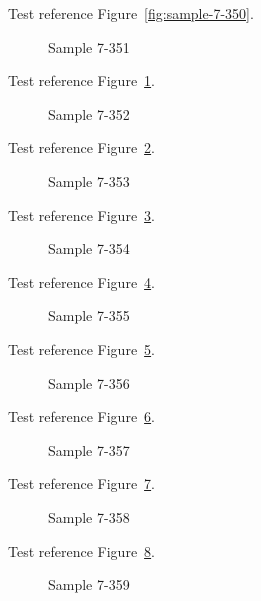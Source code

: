 Test reference Figure~\ref{fig:sample-7-350}.

\begin{figure}[tbhp]
\caption{Sample 7-351}
\label{fig:sample-7-351}
\end{figure}

Test reference Figure~\ref{fig:sample-7-351}.

\begin{figure}[tbhp]
\caption{Sample 7-352}
\label{fig:sample-7-352}
\end{figure}

Test reference Figure~\ref{fig:sample-7-352}.

\begin{figure}[tbhp]
\caption{Sample 7-353}
\label{fig:sample-7-353}
\end{figure}

Test reference Figure~\ref{fig:sample-7-353}.

\begin{figure}[tbhp]
\caption{Sample 7-354}
\label{fig:sample-7-354}
\end{figure}

Test reference Figure~\ref{fig:sample-7-354}.

\begin{figure}[tbhp]
\caption{Sample 7-355}
\label{fig:sample-7-355}
\end{figure}

Test reference Figure~\ref{fig:sample-7-355}.

\begin{figure}[tbhp]
\caption{Sample 7-356}
\label{fig:sample-7-356}
\end{figure}

Test reference Figure~\ref{fig:sample-7-356}.

\begin{figure}[tbhp]
\caption{Sample 7-357}
\label{fig:sample-7-357}
\end{figure}

Test reference Figure~\ref{fig:sample-7-357}.

\begin{figure}[tbhp]
\caption{Sample 7-358}
\label{fig:sample-7-358}
\end{figure}

Test reference Figure~\ref{fig:sample-7-358}.

\begin{figure}[tbhp]
\caption{Sample 7-359}
\label{fig:sample-7-359}
\end{figure}

